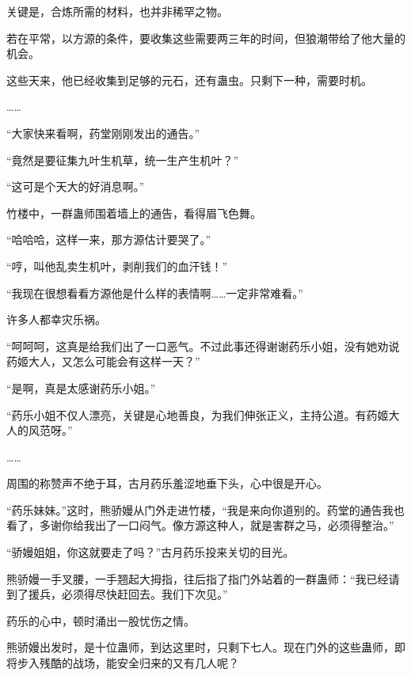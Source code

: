 \begin{this_body}
关键是，合炼所需的材料，也并非稀罕之物。

若在平常，以方源的条件，要收集这些需要两三年的时间，但狼潮带给了他大量的机会。

这些天来，他已经收集到足够的元石，还有蛊虫。只剩下一种，需要时机。

……

“大家快来看啊，药堂刚刚发出的通告。”

“竟然是要征集九叶生机草，统一生产生机叶？”

“这可是个天大的好消息啊。”

竹楼中，一群蛊师围着墙上的通告，看得眉飞色舞。

“哈哈哈，这样一来，那方源估计要哭了。”

“哼，叫他乱卖生机叶，剥削我们的血汗钱！”

“我现在很想看看方源他是什么样的表情啊……一定非常难看。”

许多人都幸灾乐祸。

“呵呵呵，这真是给我们出了一口恶气。不过此事还得谢谢药乐小姐，没有她劝说药姬大人，又怎么可能会有这样一天？”

“是啊，真是太感谢药乐小姐。”

“药乐小姐不仅人漂亮，关键是心地善良，为我们伸张正义，主持公道。有药姬大人的风范呀。”

……

周围的称赞声不绝于耳，古月药乐羞涩地垂下头，心中很是开心。

“药乐妹妹。”这时，熊骄嫚从门外走进竹楼，“我是来向你道别的。药堂的通告我也看了，多谢你给我出了一口闷气。像方源这种人，就是害群之马，必须得整治。”

“骄嫚姐姐，你这就要走了吗？”古月药乐投来关切的目光。

熊骄嫚一手叉腰，一手翘起大拇指，往后指了指门外站着的一群蛊师：“我已经请到了援兵，必须得尽快赶回去。我们下次见。”

药乐的心中，顿时涌出一股忧伤之情。

熊骄嫚出发时，是十位蛊师，到达这里时，只剩下七人。现在门外的这些蛊师，即将步入残酷的战场，能安全归来的又有几人呢？

\end{this_body}

